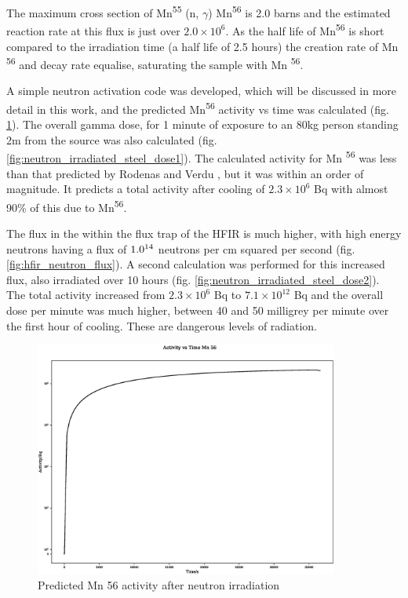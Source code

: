 The maximum cross section of Mn\textsuperscript{55} (n, $\gamma$) Mn\textsuperscript{56} is 2.0 barns and the estimated reaction rate at this flux is just over $2.0 \times 10^6$.  As the half life of Mn\textsuperscript{56} is short compared to the irradiation time (a half life of 2.5 hours) the creation rate of Mn \textsuperscript{56} and decay rate equalise, saturating the sample with Mn \textsuperscript{56}.

A simple neutron activation code was developed, which will be discussed in more detail in this work, and the predicted Mn\textsuperscript{56} activity vs time was calculated (fig. \ref{fig:mn56activity}).  The overall gamma dose, for 1 minute of exposure to an 80kg person standing 2m from the source was also calculated (fig. \ref{fig:neutron_irradiated_steel_dose1}).  The calculated activity for Mn \textsuperscript{56} was less than that predicted by Rodenas and Verdu \cite{radionuclides}, but it was within an order of magnitude.  It predicts a total activity after cooling of $2.3\times10^6$ Bq with almost 90\% of this due to Mn\textsuperscript{56}.

The flux in the within the flux trap of the HFIR is much higher, with high energy neutrons having a flux of $1.0 \time 10^{14}$ neutrons per cm squared per second (fig. \ref{fig:hfir_neutron_flux}).  A second calculation was performed for this increased flux, also irradiated over 10 hours (fig. \ref{fig:neutron_irradiated_steel_dose2}).  The total activity increased from $2.3\times10^6$ Bq to $7.1\times10^{12}$ Bq and the overall dose per minute was much higher, between 40 and 50 milligrey per minute over the first hour of cooling.  These are dangerous levels of radiation.

\begin{figure}
  \begin{center}
    \includegraphics[width=10.0cm]{chapters/consequences_of_ionizing_radiation/neutron_plots/1/25_Mn_56_activity.eps}
    \caption{Predicted Mn 56 activity after neutron irradiation}
    \label{fig:mn56activity}
  \end{center}
\end{figure}

